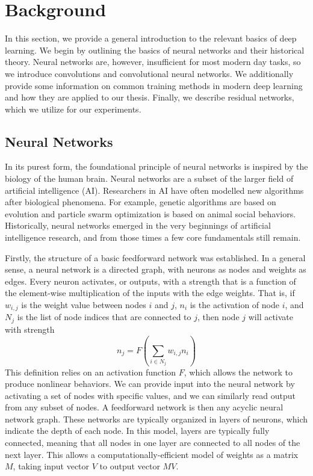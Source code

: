 \chapter{Background}

In this section, we provide a general introduction to the relevant basics of deep learning.
We begin by outlining the basics of neural networks and their historical theory.
Neural networks are, however, insufficient for most modern day tasks, so we introduce convolutions and convolutional neural networks.
We additionally provide some information on common training methods in modern deep learning and how they are applied to our thesis.
Finally, we describe residual networks, which we utilize for our experiments.


\section{Neural Networks}
In its purest form, the foundational principle of neural networks is inspired by the biology of the human brain.
Neural networks are a subset of the larger field of artificial intelligence (AI).
Researchers in AI have often modelled new algorithms after biological phenomena. For example, genetic algorithms are based on evolution and particle swarm optimization is based on animal social behaviors.
Historically, neural networks emerged in the very beginnings of artificial intelligence research, and from those times a few core fundamentals still remain.

Firstly, the structure of a basic feedforward network was established.
In a general sense, a neural network is a directed graph, with neurons as nodes and weights as edges.
Every neuron activates, or outputs, with a strength that is a function of the element-wise multiplication of the inputs with the edge weights.
That is, if $w_{i,j}$ is the weight value between nodes $i$ and $j$, $n_i$ is the activation of node $i$, and $N_j$ is the list of node indices that are connected to $j$, then node $j$ will activate with strength
\[n_j = F\left(\sum_{i \in N_j} w_{i,j}n_i \right)\]
This definition relies on an activation function $F$, which allows the network to produce nonlinear behaviors.
We can provide input into the neural network by activating a set of nodes with specific values, and we can similarly read output from any subset of nodes.
A feedforward network is then any acyclic neural network graph.
These networks are typically organized in layers of neurons, which indicate the depth of each node.
In this model, layers are typically fully connected, meaning that all nodes in one layer are connected to all nodes of the next layer.
This allows a computationally-efficient model of weights as a matrix $M$, taking input vector $V$ to output vector $MV$.

